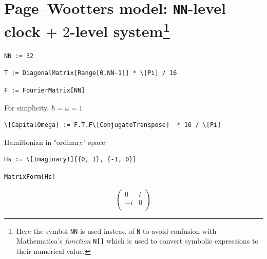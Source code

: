\section[
  \texttt{NN}-level clock $+$ $2$-level system
]{%
  Page--Wootters model: \texttt{NN}-level clock $+$ $2$-level system\footnote{
    Here the symbol \texttt{NN} is used instead of \texttt{N} to avoid confusion with
    Mathematica's \emph{function} \texttt{N[]} which
    is used to convert symbolic expressions to their numerical value.
  }
}
\label{appendix:n-level}

\begin{Verbatim}
NN := 32
\end{Verbatim}

\begin{Verbatim}
T := DiagonalMatrix[Range[0,NN-1]] * \[Pi] / 16
\end{Verbatim}

\begin{Verbatim}
F := FourierMatrix[NN]
\end{Verbatim}

For simplicity, $\hbar = \omega = 1$

\begin{Verbatim}
\[CapitalOmega] := F.T.F\[ConjugateTranspose]  * 16 / \[Pi]
\end{Verbatim}

Hamiltonian in "ordinary" space
\begin{Verbatim}
Hs := \[ImaginaryI]{{0, 1}, {-1, 0}}
\end{Verbatim}
\begin{Verbatim}
MatrixForm[Hs]
\end{Verbatim}
\[
  \left(
    \begin{array}{cc}
     0 & i \\
     -i & 0 \\
    \end{array}
    \right)
\]

